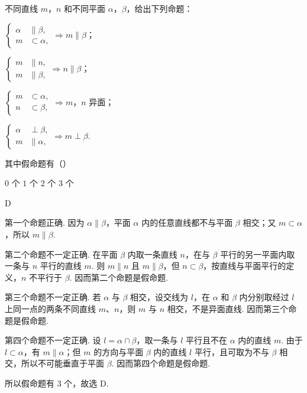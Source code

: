 \begin{problem}
不同直线 \(m\)，\(n\) 和不同平面 \(\alpha\)，\(\beta\)，给出下列命题：

\begin{circlelist}
\item \(\begin{cases}
\alpha&\parallel\beta,\\
m&\subset\alpha,
\end{cases}\Rightarrow m\parallel\beta\)；
\item \(\begin{cases}
m&\parallel n,\\
m&\parallel\beta,
\end{cases}\Rightarrow n\parallel\beta\)；
\item \(\begin{cases}
m&\subset\alpha,\\
n&\subset\beta,
\end{cases}\Rightarrow m\)，\(n\) 异面；
\item \(\begin{cases}
\alpha&\perp\beta,\\
m&\parallel\alpha,
\end{cases}\Rightarrow m\perp\beta\).
\end{circlelist}

其中假命题有（\quad）

\choices
    {\(0\) 个}
    {\(1\) 个}
    {\(2\) 个}
    {\(3\) 个}
\end{problem}

\begin{answer}
D
\end{answer}

\begin{solution}
第一个命题正确. 因为 \(\alpha\parallel\beta\)，平面 \(\alpha\) 内的任意直线都不与平面 \(\beta\) 相交；又 \(m\subset\alpha\)，所以 \(m\parallel\beta\).

第二个命题不一定正确. 在平面 \(\beta\) 内取一条直线 \(n\)，在与 \(\beta\) 平行的另一平面内取一条与 \(n\) 平行的直线 \(m\). 则 \(m\parallel n\) 且 \(m\parallel\beta\)，但 \(n\subset\beta\)，按直线与平面平行的定义，\(n\) 不平行于 \(\beta\). 因而第二个命题是假命题.

第三个命题不一定正确. 若 \(\alpha\) 与 \(\beta\) 相交，设交线为 \(l\)，在 \(\alpha\) 和 \(\beta\) 内分别取经过 \(l\) 上同一点的两条不同直线 \(m\)、\(n\)，则 \(m\) 与 \(n\) 相交，不是异面直线. 因而第三个命题是假命题.

第四个命题不一定正确. 设 \(l=\alpha\cap\beta\)，取一条与 \(l\) 平行且不在 \(\alpha\) 内的直线 \(m\). 由于 \(l\subset\alpha\)，有 \(m\parallel\alpha\)；但 \(m\) 的方向与平面 \(\beta\) 内的直线 \(l\) 平行，且可取为不与 \(\beta\) 相交，所以不可能垂直于平面 \(\beta\). 因而第四个命题是假命题.

所以假命题有 3 个，故选 D.
\end{solution}

